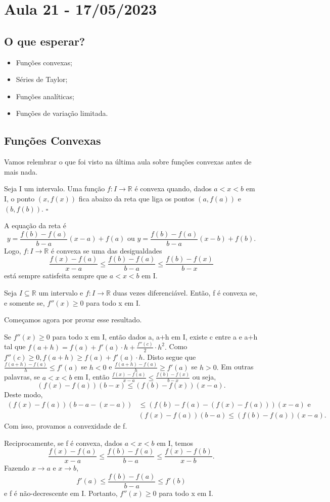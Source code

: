 \documentclass[analysis_notes.tex]{subfiles}
\begin{document}
\section{Aula 21 - 17/05/2023}
\subsection{O que esperar?}
\begin{itemize}
	\item Fun\c cões convexas;
	\item Séries de Taylor;
	\item Fun\c cões analíticas;
	\item Fun\c cões de varia\c cão limitada.
\end{itemize}
\subsection{Fun\c cões Convexas}
Vamos relembrar o que foi visto na última aula sobre fun\c cões convexas antes de mais nada.
\begin{def*}
	Seja I um intervalo. Uma fun\c cão \(f:I\rightarrow \mathbb{R}\) é convexa quando,
	dados \(a < x < b\) em I, o ponto \((x, f(x))\) fica abaixo da reta que
	liga os pontos \((a, f(a))\) e \((b, f(b))\). \(\square\)
\end{def*}
A equa\c cão da reta é
\[
	y = \frac{f(b)-f(a)}{b-a}(x-a)+f(a) \text{ ou } y = \frac{f(b)-f(a)}{b-a}(x-b)+f(b).
\]
Logo, \(f:I\rightarrow \mathbb{R}\) é convexa se uma das desigualdades
\[
	\frac{f(x) - f(a)}{x-a}\leq \frac{f(b) - f(a)}{b-a}\leq \frac{f(b)-f(x)}{b-x}
\]
está sempre satisfeita sempre que \(a < x < b\) em I.
\begin{theorem*}
	Seja \(I\subseteq{\mathbb{R}}\) um intervalo e \(f:I\rightarrow \mathbb{R}\) duas vezes diferenciável.
	Então, f é convexa se, e somente se, \(f''(x)\geq 0\) para todo x em I.
\end{theorem*}
Come\c camos agora por provar esse resultado.
\begin{proof*}
	Se \(f''(x)\geq 0\) para todo x em I, então dados a, a+h em I, existe
	c entre a e a+h tal que \(f(a+h) = f(a) + f'(a)\cdot h + \frac{f''(c)}{2}\cdot h^{2}.\)
	Como \(f''(c)\geq 0, f(a+h)\geq f(a) + f'(a)\cdot h.\) Disto segue que
	\(\frac{f(a+h)-f(a)}{h}\leq f'(a)\) se \(h < 0\) e \(\frac{f(a+h)-f(a)}{h}\geq f'(a)\)
	se \(h > 0.\) Em outras palavras, se \(a < x < b\) em I, então \(\frac{f(x)-f(a)}{x-a}\leq \frac{f(b)-f(x)}{b-x}\)
	ou seja,
	\[
		(f(x)-f(a))(b-x)\leq (f(b)-f(x))(x-a).
	\]
	Deste modo,
	\begin{align*}
		(f(x)-f(a))(b-a-(x-a)) & \leq (f(b)-f(a)-(f(x)-f(a)))(x-a)\text{ e } \\
		                       & (f(x)-f(a))(b-a)\leq (f(b)-f(a))(x-a).
	\end{align*}
	Com isso, provamos a convexidade de f.

	Reciprocamente, se f é convexa, dados \(a < x < b\) em I, temos
	\[
		\frac{f(x)-f(a)}{x-a}\leq \frac{f(b)-f(a)}{b-a}\leq \frac{f(x) - f(b)}{x-b}.
	\]
	Fazendo \(x\rightarrow a\) e \(x\rightarrow b\),
	\[
		f'(a)\leq \frac{f(b)-f(a)}{b-a}\leq f'(b)
	\]
	e f é não-decrescente em I. Portanto, \(f''(x)\geq 0\) para todo x em I. \qedsymbol
\end{proof*}
\end{document}
